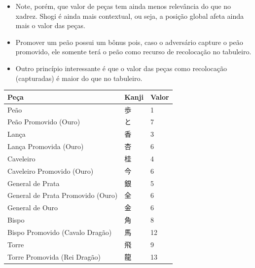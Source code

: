 \documentclass[14pt]{extarticle}
\renewcommand{\_}{\leavevmode\kern.06em\vbox{\hrule width.425em}}
\begin{document}
  \begin{itemize}
    \item Note, porém, que valor de peças tem ainda menos relevância do que no xadrez. Shogi é ainda mais contextual, ou seja, a posição global afeta ainda mais o valor das peças.
    \item Promover um peão possui um bônus pois, caso o adversário capture o peão promovido, ele somente terá o peão como recurso de recolocação no tabuleiro.
    \item Outro princípio interessante é que o valor das peças como recolocação (capturadas) é maior do que no tabuleiro.
  \end{itemize}

  \begin{center}
    \renewcommand{\arraystretch}{1.25}
    \setlength{\tabcolsep}{0.5cm}

    \begin{tabular}{ | l | l | l | }
      \hline
      \textbf{Peça} & \textbf{Kanji} & \textbf{Valor} \\
      \hline\hline
      Peão                              & 歩 & 1  \\
      Peão Promovido (Ouro)             & と & 7  \\
      Lança                             & 香 & 3  \\
      Lança Promovida (Ouro)            & 杏 & 6  \\
      Caveleiro                         & 桂 & 4  \\
      Caveleiro Promovido (Ouro)        & 今 & 6  \\
      General de Prata                  & 銀 & 5  \\
      General de Prata Promovido (Ouro) & 全 & 6  \\
      General de Ouro                   & 金 & 6  \\
      Bispo                             & 角 & 8  \\
      Bispo Promovido (Cavalo Dragão)   & 馬 & 12 \\
      Torre                             & 飛 & 9  \\
      Torre Promovida (Rei Dragão)      & 龍 & 13 \\
      \hline
    \end{tabular}
  \end{center}
  
  \vspace{1cm}
  
  \pagebreak
  
\end{document}
